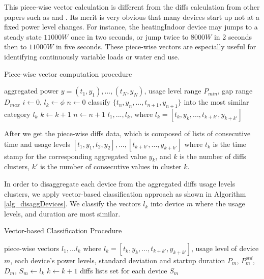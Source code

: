 This piece-wise vector calculation is different from the diffs calculation from other papers 
such as \cite{shao2013temporal} and \cite{kolter2012aistat}. 
Its merit is very obvious that many devices start up not at a fixed power level changes. 
For instance, the heatingIndoor device may jumps to a steady state 
$11000W$ once in two seconds, or jump twice to $8000W$ in 2 seconds then to 
$11000W$ in five seconds. 
These piece-wise vectors are especially useful for identifying continuously variable loads or 
water end use.  

\begin{algorithm}
\caption{Piece-wise vector computation procedure}
\begin{algorithmic}[1] 
\label{alg_vectorSelection}
\REQUIRE  aggregated power $y = (t_1, y_1),..., (t_N, y_N)$, usage level range $P_{min}$, gap range $D_{max}$
\STATE $i \leftarrow 0$, $l_k \leftarrow \phi$
\STATE $n \leftarrow 0$
\STATE classify $\{t_n, y_n, ..., t_{n+1}, y_{n+1}\}$ into the most similar category  $l_k$
\ELSE
\STATE $k \leftarrow k + 1$
\ENDIF
\STATE $n \leftarrow n+1$
\ENDWHILE
\RETURN $l_1,..., l_k$, where $l_k= [t_k, y_k, ..., t_{k+k'}, y_{k+k'}]$
\end{algorithmic}
\end{algorithm}

After we get the piece-wise diffs data, which is composed of lists of consecutive time and usage levels 
$[t_1, y_1, t_2, y_2], ..., [t_{k+k'}, ..., y_{k+k'}]$ where $t_k$ is the time stamp for 
the corresponding aggregated value $y_k$, and $k$ is the number of diffs clusters, 
$k'$ is the number of consecutive values in cluster $k$. 

In order to disaggregate each device from the aggregated diffs usage levels clusters, 
we apply vector-based classification approach as shown in Algorithm \ref{alg_disaggDevices}.
We classify the vectors $l_k$ into device $m$ where the usage levels, and duration are most similar. 

\begin{algorithm}
\caption{Vector-based Classification Procedure}
\begin{algorithmic}[1]
\label{alg_disaggDevices}
\REQUIRE piece-wise vectors $l_1,...l_k$ where $l_k= [t_k, y_k, ..., t_{k+k'}, y_{k+k'}]$, 
usage level of device $m$, each device's power levels, standard deviation and startup duration $P_m$, $P_m^{std}$, $D_m$,
\STATE $S_m \leftarrow l_k $
\ENDIF
\STATE $ k \leftarrow k+1$
\ENDWHILE
\ENDFOR
\RETURN diffs lists set for each device $S_m$
\end{algorithmic}
\end{algorithm}



